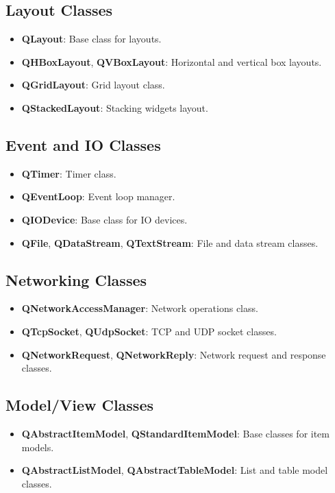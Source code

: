 \documentclass{report}
\begin{document}
    \bigbreak \noindent 
    \subsection{Layout Classes}
    \begin{itemize}
        \item \textbf{QLayout}: Base class for layouts.
        \item \textbf{QHBoxLayout}, \textbf{QVBoxLayout}: Horizontal and vertical box layouts.
        \item \textbf{QGridLayout}: Grid layout class.
        \item \textbf{QStackedLayout}: Stacking widgets layout.
    \end{itemize}

    \bigbreak \noindent 
    \subsection{Event and IO Classes}
    \begin{itemize}
        \item \textbf{QTimer}: Timer class.
        \item \textbf{QEventLoop}: Event loop manager.
        \item \textbf{QIODevice}: Base class for IO devices.
        \item \textbf{QFile}, \textbf{QDataStream}, \textbf{QTextStream}: File and data stream classes.
    \end{itemize}

    \bigbreak \noindent 
    \subsection{Networking Classes}
    \begin{itemize}
        \item \textbf{QNetworkAccessManager}: Network operations class.
        \item \textbf{QTcpSocket}, \textbf{QUdpSocket}: TCP and UDP socket classes.
        \item \textbf{QNetworkRequest}, \textbf{QNetworkReply}: Network request and response classes.
    \end{itemize}

    \bigbreak \noindent 
    \subsection{Model/View Classes}
    \begin{itemize}
        \item \textbf{QAbstractItemModel}, \textbf{QStandardItemModel}: Base classes for item models.
        \item \textbf{QAbstractListModel}, \textbf{QAbstractTableModel}: List and table model classes.
    \end{itemize}
\end{document}
